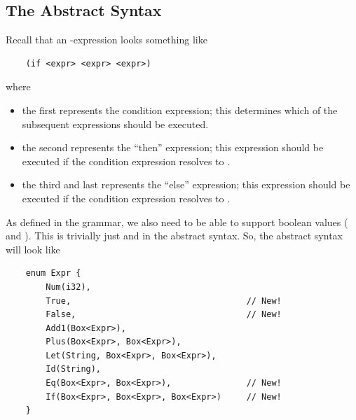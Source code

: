 \subsection{The Abstract Syntax}
Recall that an -expression looks something like 
\begin{verbatim}
    (if <expr> <expr> <expr>)\end{verbatim}
where 
\begin{itemize}
    \item the first  represents the condition expression; this determines which of the subsequent expressions should be executed. 
    \item the second  represents the ``then'' expression; this expression should be executed if the condition expression resolves to .
    \item the third and last  represents the ``else'' expression; this expression should be executed if the condition expression resolves to .
\end{itemize}
As defined in the grammar, we also need to be able to support boolean values ( and ). This is trivially just  and  in the abstract syntax. So, the abstract syntax will look like 
\begin{verbatim}
    enum Expr {
        Num(i32),
        True,                                   // New!
        False,                                  // New!
        Add1(Box<Expr>),
        Plus(Box<Expr>, Box<Expr>),
        Let(String, Box<Expr>, Box<Expr>),
        Id(String),
        Eq(Box<Expr>, Box<Expr>),               // New!
        If(Box<Expr>, Box<Expr>, Box<Expr>)     // New!
    }\end{verbatim}

